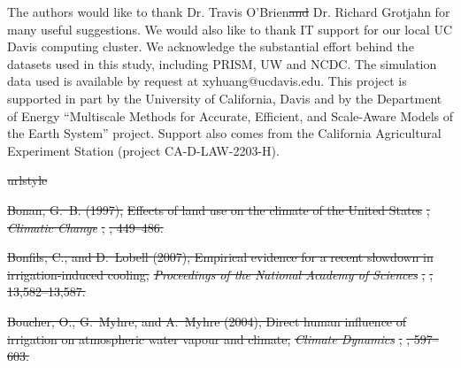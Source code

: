 \documentclass[draft,ms]{agutex}   %
\providecommand{\DIFadd}[1]{{\protect\color{blue}\uwave{#1}}} %
\providecommand{\DIFdel}[1]{{\protect\color{red}\sout{#1}}}                      %
\providecommand{\DIFaddbegin}{} %
\providecommand{\DIFaddend}{} %
\providecommand{\DIFdelbegin}{} %
\providecommand{\DIFdelend}{} %
\begin{document}
\begin{article}
\begin{acknowledgments}

The authors would like to thank Dr. Travis O'Brien\DIFdelbegin \DIFdel{and }\DIFdelend \DIFaddbegin \DIFadd{, }\DIFaddend Dr. Richard Grotjahn \DIFaddbegin \DIFadd{and Dr. Graham E. Fogg }\DIFaddend for many useful suggestions. We would also like to thank IT support for our local UC Davis computing cluster. We acknowledge the substantial effort behind the datasets used in this study, including PRISM, UW and NCDC. The simulation data used is available by request at xyhuang@ucdavis.edu. This project is supported in part by the University of California, Davis and by the Department of Energy ``Multiscale Methods for Accurate, Efficient, and Scale-Aware Models of the Earth System'' project. Support also comes from the California Agricultural Experiment Station (project CA-D-LAW-2203-H). 

\end{acknowledgments}

\DIFaddbegin 

\DIFaddend 


\DIFdelbegin %
\DIFdel{urlstyle}%

\DIFdel{Bonan, G.~B. (1997), }%
\DIFdel{Effects of land use on the climate of the United States}%
\DIFdel{,
  }\textit{\DIFdel{Climatic Change}}%
\DIFdel{, }%
\DIFdel{, 449--486.
}%

\DIFdel{Bonfils, C., and D.~Lobell (2007), Empirical evidence for a recent slowdown in
  irrigation-induced cooling, }\textit{\DIFdel{Proceedings of the National Academy of
  Sciences}}%
\DIFdel{, }%
\DIFdel{, 13,582--13,587.
}%

\DIFdel{Boucher, O., G.~Myhre, and A.~Myhre (2004), Direct human influence of
  irrigation on atmospheric water vapour and climate, }\textit{\DIFdel{Climate
  Dynamics}}%
\DIFdel{, }%
\DIFdel{, 597--603.
}%


\end{article}
\end{document}
